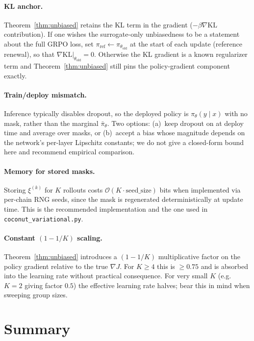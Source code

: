 \documentclass[11pt]{article}
\theoremstyle{definition}
\theoremstyle{remark}
\newcommand{\KL}{\mathrm{KL}}
\newcommand{\old}{\mathrm{old}}
\begin{document}
\paragraph{KL anchor.}
Theorem~\ref{thm:unbiased} retains the KL term in the gradient
($-\beta\nabla\KL$ contribution).  If one wishes the surrogate-only
unbiasedness to be a statement about the full GRPO loss, set
$\pi_{\mathrm{ref}} \gets \pi_{\theta_\old}$ at the start of each update
(reference renewal), so that $\nabla\KL|_{\theta_\old} = 0$.  Otherwise
the KL gradient is a known regularizer term and Theorem~\ref{thm:unbiased}
still pins the policy-gradient component exactly.

\paragraph{Train/deploy mismatch.}
Inference typically disables dropout, so the deployed policy is
$\pi_\theta(y\mid x)$ with no mask, rather than the marginal
$\bar\pi_\theta$.  Two options: (a)~keep dropout on at deploy time and
average over masks, or (b)~accept a bias whose magnitude depends on the
network's per-layer Lipschitz constants; we do not give a closed-form
bound here and recommend empirical comparison.

\paragraph{Memory for stored masks.}
Storing $\xi^{(k)}$ for $K$ rollouts costs $\mathcal{O}(K \cdot
\mathrm{seed\_size})$ bits when implemented via per-chain RNG seeds, since
the mask is regenerated deterministically at update time.  This is the
recommended implementation and the one used in
\texttt{coconut\_variational.py}.

\paragraph{Constant $(1 - 1/K)$ scaling.}
Theorem~\ref{thm:unbiased} introduces a $(1 - 1/K)$ multiplicative factor
on the policy gradient relative to the true $\nabla J$.  For $K \ge 4$
this is $\ge 0.75$ and is absorbed into the learning rate without
practical consequence.  For very small $K$ (e.g.\ $K = 2$ giving factor
$0.5$) the effective learning rate halves; bear this in mind when
sweeping group sizes.

\section{Summary}
\end{document}
